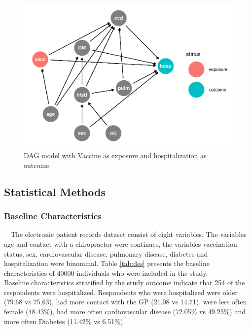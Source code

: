 \documentclass[
]{article}
\begin{document}
\begin{figure}
\includegraphics[width=0.5\linewidth]{Assignment_files/figure-latex/dag-1} \caption{DAG model with Vaccine as exposure and hospitalization as outcome}\label{fig:dag}
\end{figure}

\hypertarget{statistical-methods}{%
\subsection{Statistical Methods}\label{statistical-methods}}

\hypertarget{baseline-characteristics}{%
\subsubsection{Baseline Characteristics}\label{baseline-characteristics}}

~~The electronic patient records dataset consist of eight variables. The variables age and contact with a chiropractor were continues, the variables vaccination status, sex, cardiovascular disease, pulmonary disease, diabetes and hospitalization were binominal. Table \ref{tab:des} presents the baseline characteristics of 40000 individuals who were included in the study.\\
\hspace*{0.333em}\hspace*{0.333em}Baseline characteristics stratified by the study outcome indicate that 254 of the respondents were hospitalized. Respondents who were hospitalized were older (79.68 vs 75.63), had more contact with the GP (21.08 vs 14.71), were less often female (48.43\%), had more often cardiovascular disease (72.05\% vs 49.25\%) and more often Diabetes (11.42\% vs 6.51\%).
\end{document}
